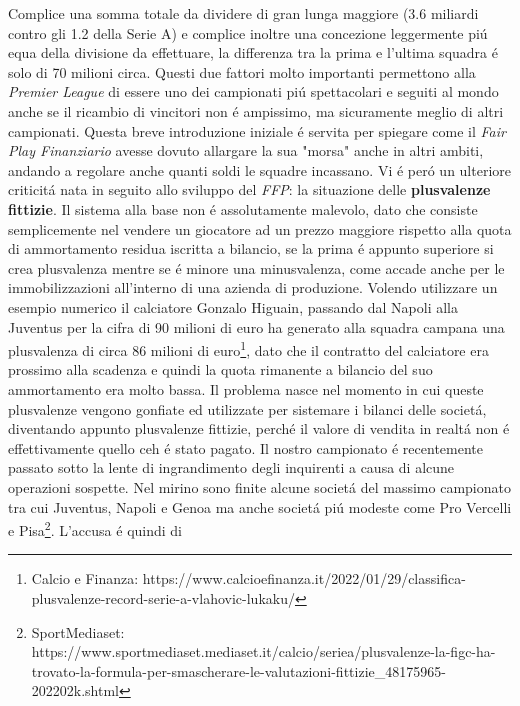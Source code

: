 \documentclass[
    corpo=12pt,
    oneside,
    evenboxes,
    tipotesi=triennale,
    stile=classica,
    oldstyle,
    autoretitolo,
    greek,
]{toptesi}
\begin{document}
\begin{interlinea}{1.5}
\begin{itemize}
\end{itemize}
Complice una somma totale da dividere di gran lunga maggiore (3.6 miliardi contro gli 1.2 della Serie A) e complice inoltre una 
concezione leggermente pi\'u equa della divisione da effettuare, la differenza tra la prima e l'ultima squadra \'e solo di 70 milioni circa.
Questi due fattori molto importanti permettono alla \emph{Premier League} di essere uno dei campionati pi\'u spettacolari e seguiti al mondo anche se 
il ricambio di vincitori non \'e ampissimo, ma sicuramente meglio di altri campionati.\newline
Questa breve introduzione iniziale \'e servita per spiegare come il \emph{Fair Play Finanziario} avesse dovuto allargare la sua "morsa" anche 
in altri ambiti, andando a regolare anche quanti soldi le squadre incassano.\newline
Vi \'e per\'o un ulteriore criticit\'a nata in seguito allo sviluppo del \emph{FFP}: la situazione delle \textbf{plusvalenze fittizie}.
Il sistema alla base non \'e assolutamente malevolo, dato che consiste semplicemente nel vendere un giocatore ad un prezzo maggiore rispetto
alla quota di ammortamento residua iscritta a bilancio, se la prima \'e appunto superiore si crea plusvalenza mentre se \'e minore una 
minusvalenza, come accade anche per le immobilizzazioni all'interno di una azienda di produzione. Volendo utilizzare un esempio numerico il 
calciatore Gonzalo Higuain, passando dal Napoli alla Juventus per la cifra di 90 milioni di euro ha generato alla squadra campana una plusvalenza
di circa 86 milioni di euro\footnote{Calcio e Finanza: https://www.calcioefinanza.it/2022/01/29/classifica-plusvalenze-record-serie-a-vlahovic-lukaku/}, 
dato che il contratto del calciatore era prossimo alla scadenza e quindi la quota rimanente a bilancio del suo ammortamento era molto bassa. 
Il problema nasce nel momento in cui queste plusvalenze vengono gonfiate ed utilizzate per sistemare i bilanci delle societ\'a, diventando 
appunto plusvalenze fittizie, perch\'e il valore di vendita in realt\'a non \'e effettivamente quello ceh \'e stato pagato. Il nostro campionato
\'e recentemente passato sotto la lente di ingrandimento degli inquirenti a causa di alcune operazioni sospette. Nel mirino sono finite alcune societ\'a
del massimo campionato tra cui Juventus, Napoli e Genoa ma anche societ\'a pi\'u modeste come Pro Vercelli e Pisa\footnote{SportMediaset: https://www.sportmediaset.mediaset.it/calcio/seriea/plusvalenze-la-figc-ha-trovato-la-formula-per-smascherare-le-valutazioni-fittizie\_48175965-202202k.shtml}. L'accusa \'e quindi di 

\end{interlinea}
\end{document}
